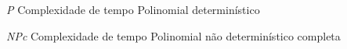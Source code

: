 \documentclass[
	12pt,				%
	openright,			%
	oneside,			%
	a4paper,			%
	english,			%
	french,				%
	spanish,			%
	brazil				%
	]{abntex2}
\begin{document}
\listoffigures*
\cleardoublepage

\listoftables*
\cleardoublepage

\begin{siglas}
  \item[\textit{P}] Complexidade de tempo Polinomial determinístico
  \item[\textit{NPc}] Complexidade de tempo Polinomial não determinístico completa
\end{siglas}
%

\tableofcontents*
\cleardoublepage



\textual

\end{document}
